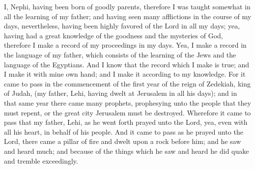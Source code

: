 \bchapter
\bverse \iffalse I, Nephi, having been born of goodly parents, therefore I was taught somewhat in all the learning of my father; and having seen many afflictions in the course of my days, nevertheless, having been highly favored of the Lord in all my days; yea, having had a great knowledge of the goodness and the mysteries of God, therefore I make a record of my proceedings in my days. \fi
I, Nephi, having been born of goodly parents, therefore I was taught somewhat in all the learning of my father; and having seen many afflictions in the course of my days, nevertheless, having been highly favored of the Lord in all my days; yea, having had a great knowledge of the goodness and the mysteries of God, therefore I make a record of my proceedings in my days.
\bverse \iffalse Yea, I make a record in the language of my father, which consists of the learning of the Jews and the language of the Egyptians. \fi
Yea, I make a record in the language of my father, which consists of the learning of the Jews and the language of the Egyptians.
\bverse \iffalse And I know that the record which I make is true; and I make it with mine own hand; and I make it according to my knowledge. \fi
And I know that the record which I make is true; and I make it with mine own hand; and I make it according to my knowledge.
\bverse \iffalse For it came to pass in the commencement of the first year of the reign of Zedekiah, king of Judah, (my father, Lehi, having dwelt at Jerusalem in all his days); and in that same year there came many prophets, prophesying unto the people that they must repent, or the great city Jerusalem must be destroyed. \fi
For it came to pass in the commencement of the first year of the reign of Zedekiah, king of Judah, (my father, Lehi, having dwelt at Jerusalem in all his days); and in that same year there came many prophets, prophesying unto the people that they must repent, or the great city Jerusalem must be destroyed.
\bverse \iffalse Wherefore it came to pass that my father, Lehi, as he went forth prayed unto the Lord, yea, even with all his heart, in behalf of his people. \fi
Wherefore it came to pass that my father, Lehi, as he went forth prayed unto the Lord, yea, even with all his heart, in behalf of his people.
\bverse \iffalse And it came to pass as he prayed unto the Lord, there came a pillar of fire and dwelt upon a rock before him; and he saw and heard much; and because of the things which he saw and heard he did quake and tremble exceedingly. \fi
And it came to pass as he prayed unto the Lord, there came a pillar of fire and dwelt upon a rock before him; and he saw and heard much; and because of the things which he saw and heard he did quake and tremble exceedingly.
